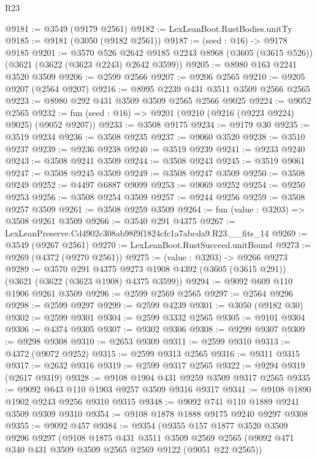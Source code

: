 \begin{lexlean}{R23}
\begin{coremodule}
@9181 := @3549 (@9179 @2561)
@9182 := LexLeanBoot.RustBodies.unitTy
@9185 := @9181 (@3050 (@9182 @2561))
@9187 := (seed : @16) -> @9178 @9185
@9201 := @3570
    @526
    @2642
    @9185
    @2243
    @8968
    (@3605 (@3615 @526))
    (@3621 (@3622 (@3623 @2243) @2642 @3599))
@9205 := @8980 @163 @2241 @3520 @3509
@9206 := @2599 @2566
@9207 := @9206 @2565
@9210 := @9205 @9207 (@2564 @9207)
@9216 := @8995 @2239 @431 @3511 @3509 @2566 @2565
@9223 := @8980 @292 @431 @3509 @3509 @2565 @2566 @9025
@9224 := @9052 @2565
@9232 := fun (seed : @16) => @9201 (@9210 (@9216 (@9223 @9224) @9025) (@9052 @9207))
@9233 := @3508 @9175
@9234 := @9179 @30
@9235 := @3519 @9234
@9236 := @3508 @9235
@9237 := @9060 @3520
@9238 := @3510 @9237
@9239 := @9236 @9238
@9240 := @3519 @9239
@9241 := @9233 @9240
@9243 := @3508 @9241 @3509
@9244 := @3508 @9243
@9245 := @3519 @9061
@9247 := @3508 @9245 @3509
@9249 := @3508 @9247 @3509
@9250 := @3508 @9249
@9252 := @4497 @6887 @9099
@9253 := @9069 @9252
@9254 := @9250 @9253
@9256 := @3508 @9254 @3509
@9257 := @9244 @9256
@9259 := @3508 @9257 @3509
@9261 := @3508 @9259 @3509
@9264 := fun (value : @3203) => @3508 @9261 @3509
@9266 := @3540 @291 @4375
@9267 := LexLeanPreserve.Cd4902c308ab98f9f1824cfc1a7abcda9.R23.__fits_14
@9269 := @3549 (@9267 @2561)
@9270 := LexLeanBoot.RustSucceed.unitBound
@9273 := @9269 (@4372 (@9270 @2561))
@9275 := (value : @3203) -> @9266 @9273
@9289 := @3570
    @291
    @4375
    @9273
    @1908
    @4392
    (@3605 (@3615 @291))
    (@3621 (@3622 (@3623 @1908) @4375 @3599))
@9294 := @9092 @609 @110 @1906 @9261 @3509
@9296 := @2599 @2569 @2565
@9297 := @2564 @9296
@9298 := @2599 @9297
@9299 := @2599 @4239
@9301 := @3050 (@9182 @30)
@9302 := @2599 @9301
@9304 := @2599 @3332 @2565
@9305 := @9101 @9304
@9306 := @4374 @9305
@9307 := @9302 @9306
@9308 := @9299 @9307
@9309 := @9298 @9308
@9310 := @2653 @9309
@9311 := @2599 @9310
@9313 := @4372 (@9072 @9252)
@9315 := @2599 @9313 @2565
@9316 := @9311 @9315
@9317 := @2632 @9316
@9319 := @2599 @9317 @2565
@9322 := @9294 @9319 (@2617 @9319)
@9328 := @9108 @1904 @431 @9259 @3509 @9317 @2565
@9335 := @9092 @643 @110 @1903 @9257 @3509 @9316 @9317
@9341 := @9108 @1890 @1902 @9243 @9256 @9310 @9315
@9348 := @9092 @741 @110 @1889 @9241 @3509 @9309 @9310
@9354 := @9108 @1878 @1888 @9175 @9240 @9297 @9308
@9355 := @9092 @457
@9384 := @9354
    (@9355
      @157
      @1877
      @3520
      @3509
      @9296
      @9297
      (@9108
        @1875
        @431
        @3511
        @3509
        @2569
        @2565
        (@9092 @471 @340 @431 @3509 @3509 @2565 @2569 @9122 (@9051 @22 @2565))

\end{coremodule}
\end{lexlean}
